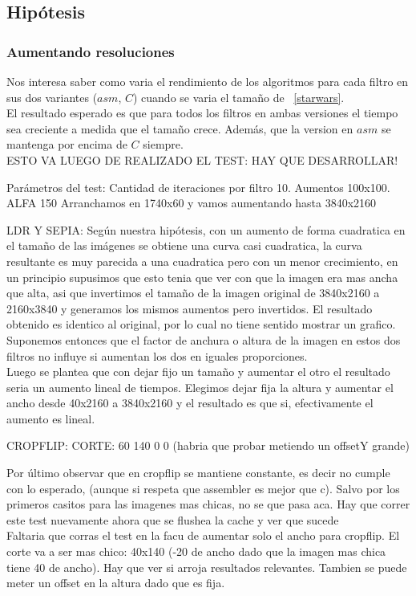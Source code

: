 \pagebreak

\subsection{Hipótesis}


\subsubsection{Aumentando resoluciones}

Nos interesa saber como varia el rendimiento de los algoritmos para cada filtro en sus dos variantes ($asm$, $C$) cuando se varia el tamaño de ~\ref{starwars}.\\

El resultado esperado es que para todos los filtros en ambas versiones el tiempo sea creciente a medida que el tamaño crece. Además, que la version en $asm$ se mantenga por encima de $C$ siempre. \\ 

ESTO VA LUEGO DE REALIZADO EL TEST: HAY QUE DESARROLLAR!

Parámetros del test: 
Cantidad de iteraciones por filtro 10. Aumentos 100x100.
ALFA 150
Arranchamos en 1740x60 y vamos aumentando hasta 3840x2160

LDR Y SEPIA: 
Según nuestra hipótesis, con un aumento de forma cuadratica en el tamaño de las imágenes se obtiene una curva casi cuadratica, la curva resultante es muy parecida a una cuadratica pero con un menor crecimiento, en un principio supusimos que esto tenia que ver con que la imagen era mas ancha que alta, asi que invertimos el tamaño de la imagen original de 3840x2160 a 2160x3840 y generamos los mismos aumentos pero invertidos. El resultado obtenido es identico al original, por lo cual no tiene sentido mostrar un grafico. Suponemos entonces que el factor de anchura o altura de la imagen en estos dos filtros no influye si aumentan los dos en iguales proporciones. \\

Luego se plantea que con dejar fijo un tamaño y aumentar el otro el resultado seria un aumento lineal de tiempos. Elegimos dejar fija la altura y aumentar el ancho desde 40x2160 a 3840x2160 y el resultado es que si, efectivamente el aumento es lineal. 

CROPFLIP:
CORTE: 60 140 0 0 (habria que probar metiendo un offsetY grande)

Por último observar que en cropflip se mantiene constante, es decir no cumple con lo esperado, (aunque si respeta que assembler es mejor que c). Salvo por los primeros casitos para las imagenes mas chicas, no se que pasa aca. Hay que correr este test nuevamente ahora que se flushea la cache y ver que sucede \\
Faltaria que corras el test en la facu de aumentar solo el ancho para cropflip. El corte va a ser mas chico: 40x140 (-20 de ancho dado que la imagen mas chica tiene 40 de ancho). Hay que ver si arroja resultados relevantes. Tambien se puede meter un offset en la altura dado que es fija. 

